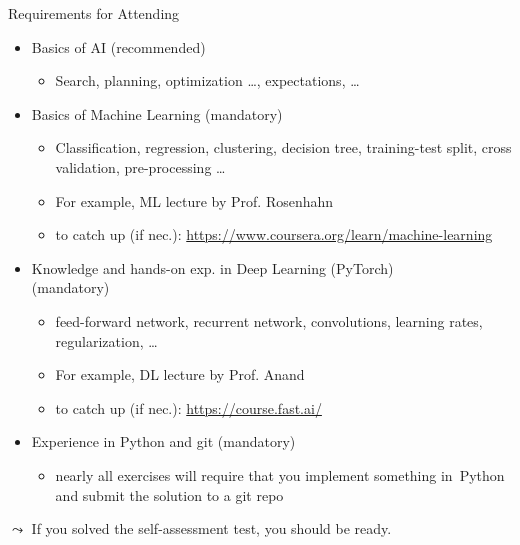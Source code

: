 \documentclass[aspectratio=169]{../latex_main/tntbeamer}  %
\begin{document}
\begin{frame}[c]{Requirements for Attending}

        \vspace{-1em}
	\begin{itemize}
		\item Basics of \alert{AI} (recommended)
		\begin{itemize}
			\item Search, planning, optimization \ldots, expectations, \ldots
		\end{itemize}
		\pause
		\item Basics of \alert{Machine Learning} (mandatory)
		\begin{itemize}
			\item Classification, regression, clustering, decision tree, training-test split, cross validation, pre-processing \ldots
			\item For example, ML lecture by Prof. Rosenhahn
			\item to catch up (if nec.):
			\url{https://www.coursera.org/learn/machine-learning} 
		\end{itemize}
		\pause
		\item Knowledge and hands-on exp. in \alert{Deep Learning} (PyTorch)\\ (mandatory)
		\begin{itemize}
			\item feed-forward network, recurrent network, convolutions, learning rates, regularization, \ldots 
			\item For example, DL lecture by Prof. Anand
			\item to catch up (if nec.): \url{https://course.fast.ai/}
		\end{itemize}
		\pause
		\item Experience in \alert{Python and git} (mandatory)
		\begin{itemize}
			\item nearly all exercises will require 
			that you implement something in~Python and submit the solution to a git repo
		\end{itemize}
	\end{itemize}
	\pause
	$\leadsto$ If you solved the self-assessment test, you should be ready.
	
\end{frame}
\end{document}
